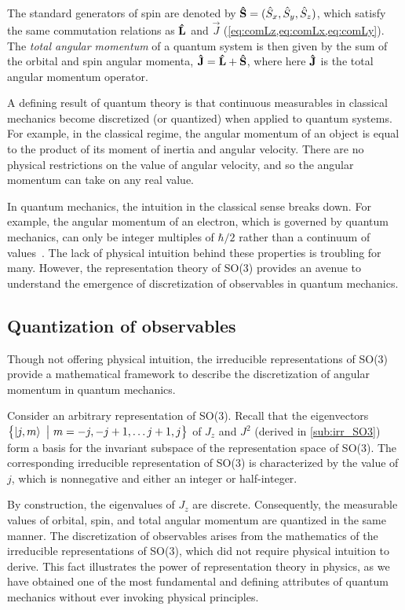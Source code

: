 The standard generators of spin are denoted by $\mathbf{\hat{S}} = (\hat{S}_x,\hat{S}_y,\hat{S}_z)$, which satisfy the same commutation relations as $\mathbf{\hat{L}}$ and $\vec{J}$ (\cref{eq:comLz,eq:comLx,eq:comLy}). The \textit{total angular momentum} of a quantum system is then given by the sum of the orbital and spin angular momenta, $\mathbf{\hat{J}} = \mathbf{\hat{L}} + \mathbf{\hat{S}}$, where here $\mathbf{\hat{J}}$ is the total angular momentum operator.

A defining result of quantum theory is that continuous measurables in classical mechanics become discretized (or quantized) when applied to quantum systems. For example, in the classical regime, the angular momentum of an object is equal to the product of its moment of inertia and angular velocity. There are no physical restrictions on the value of angular velocity, and so the angular momentum can take on any real value.

In quantum mechanics, the intuition in the classical sense breaks down. For example, the angular momentum of an electron, which is governed by quantum mechanics, can only be integer multiples of $\hbar/2$ rather than a continuum of values~\cite{Griffiths2018,Hall2013}. The lack of physical intuition behind these properties is troubling for many. However, the representation theory of SO(3) provides an avenue to understand the emergence of discretization of observables in quantum mechanics.

\subsection{Quantization of observables}
Though not offering physical intuition, the irreducible representations of SO(3) provide a mathematical framework to describe the discretization of angular momentum in quantum mechanics.

\sloppy Consider an arbitrary representation of SO(3). Recall that the eigenvectors $\left\{ \ket{j,m}~\big|~ m=-j,-j+1,\dots j+1,j \right\}$ of $J_z$ and $J^2$ (derived in \cref{sub:irr_SO3}) form a basis for the invariant subspace of the representation space of SO(3). The corresponding irreducible representation of SO(3) is characterized by the value of $j$, which is nonnegative and either an integer or half-integer.

By construction, the eigenvalues of $J_z$ are discrete. Consequently, the measurable values of orbital, spin, and total angular momentum are quantized in the same manner. The discretization of observables arises from the mathematics of the irreducible representations of SO(3), which did not require physical intuition to derive. This fact illustrates the power of representation theory in physics, as we have obtained one of the most fundamental and defining attributes of quantum mechanics without ever invoking physical principles.

